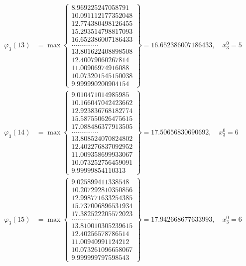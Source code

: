 \documentclass{article}
\begin{document}
\begin{align*}
  
  
  
\varphi_{3}(13) &= \max \left\{ \begin{array}{c}
8.969225247058791 \\
 10.091112177352048 \\
 12.774380498126455 \\
 15.293514798817093 \\
 16.652386007186433 \\
 .............. \\
 13.801622408898508 \\
 12.40079060267814 \\
 11.00906974916088 \\
 10.073201545150038 \\
 9.999990200904154
\end{array} \right\} = 16.652386007186433, \quad x_{3}^0 = 5\\
  
  
  
  
\varphi_{3}(14) &= \max \left\{ \begin{array}{c}
9.010471014985985 \\
 10.166047042423662 \\
 12.923836768182774 \\
 15.587550626475615 \\
 17.088486377913505 \\
 .............. \\
 13.808524070824802 \\
 12.402276837092952 \\
 11.009358699933067 \\
 10.073252756459091 \\
 9.99999854110313
\end{array} \right\} = 17.50656830690692, \quad x_{3}^0 = 6\\
  
  
  
  
\varphi_{3}(15) &= \max \left\{ \begin{array}{c}
9.025899411338548 \\
 10.207292810350856 \\
 12.998771633254385 \\
 15.737006896531934 \\
 17.382522205572023 \\
 .............. \\
 13.810010305239615 \\
 12.40256578786514 \\
 11.00940991124212 \\
 10.073261096658067 \\
 9.999999797598543
\end{array} \right\} = 17.942668677633993, \quad x_{3}^0 = 6\\
  

\end{align*}
\end{document}
